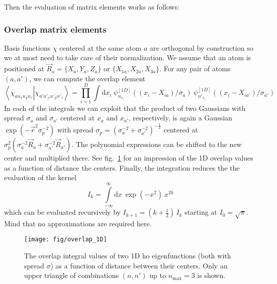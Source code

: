 \documentclass[oribibl]{llncs}
\newcommand{\um}[1]{_{\mathrm{#1}}}
\newcommand{\braket}[2]{\left\langle \left. #1 \right| #2 \right\rangle}
\begin{document}
Then the evaluation of matrix elements works as follows:

\subsubsection{Overlap matrix elements}
Basis functions $\chi$ centered at the same atom $a$ are orthogonal by construction
so we at most need to take care of their normalization.
We assume that an atom is positioned at $\vec R_a = \{ X_a, Y_a, Z_a \}$ or $\{ X_{1a}, X_{2a}, X_{3a} \}$.
For any pair of atoms $(a,a')$, we can compute the overlap element
\begin{equation}
  \braket{ \chi_{a n_x n_y n_z} }{ \chi_{a' n'_x n'_y n'_z} } = \prod_{i=1}^D
  \int\mathrm d x_i \  \psi^{[1D]}_{n_{x_i}}((x_i - X_{ia})/\sigma_a)
                    \  \psi^{[1D]}_{n'_{x_i}}((x_i - X_{ia'})/\sigma_{a'})
  \label{eqn:overlap-factorized}
\end{equation}
In each of the integrals we can exploit that the product 
of two Gaussians with spread $\sigma_a$ and $\sigma_{a'}$ 
centered at $x_a$ and $x_{a'}$, respectively, 
is again a Gaussian $\exp(-\vec r^2 \sigma_p^{-2})$ with spread $\sigma_p = \left(\sigma_a^{-2} + \sigma_{a'}^{-2}\right)^{-\frac12}$
centered at $\sigma_p^2 \left( \sigma_a^{-2} \vec R_a + \sigma_{a'}^{-2} \vec R_{a'} \right)$.
The polynomial expressions can be shifted to the new center and multiplied there.
See fig.~\ref{fig:overlap_1D} for an impression of the 1D overlap values 
as a function of distance the centers.
Finally, the integration reduces the the evaluation of the kernel
\begin{equation}
  I_k = \int\limits_{-\infty}^{\infty} \mathrm d x \  \exp(-x^2) \  x^{2k}
  \label{eqn:gauss-integral-kernel}
\end{equation}
which can be evaluated recursively by $I_{k+1} = (k + \frac12)\,I_k$ starting at $I_0 = \sqrt{\pi}$.
Mind that no approximations are required here.
%
\begin{figure}
  \begin{minipage}[c]{.990\textwidth}
	\texttt{[image: fig/overlap\_1D]} %
  \end{minipage}\hfill
  \begin{minipage}[c]{.009\textwidth}
  \end{minipage}
  \label{fig:overlap_1D}
  \caption{
	The overlap integral values of two 1D \ac{ho} eigenfunctions (both with spread $\sigma$)
	as a function of distance between their centers.
	Only an upper triangle of combinations $(n,n')$ up to $n\um{max} = 3$ is shown.
  }
\end{figure}
%
%
\end{document}
